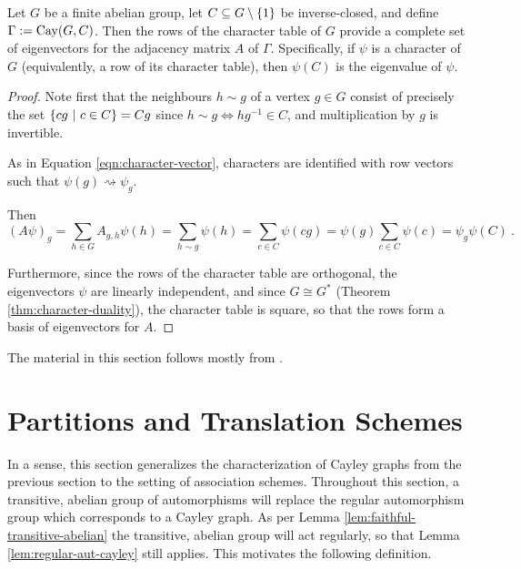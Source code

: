 \documentclass{report}
\begin{document}
    \begin{lem}\label{lem:cayley-eigen}
      Let $G$ be a finite abelian group,
      let $C \subseteq G \setminus \left\lbrace 1 \right\rbrace$ be inverse-closed,
      and define $\Gamma := \operatorname{Cay}(G, C)$.
      Then the rows of the character table of $G$ provide a complete set of
      eigenvectors for the adjacency matrix $A$ of $\Gamma$.
      Specifically, if $\psi$ is a character of $G$ (equivalently, a row of
      its character table), then $\psi(C)$ is the eigenvalue of $\psi$.
    \end{lem}

    \begin{proof}
      Note first that the neighbours $h \sim g$ of a vertex $g \in G$ consist of
      precisely the set $\left\lbrace  cg \ \middle| \ c \in C  \right\rbrace = Cg$ since $h \sim g \iff
      hg^{-1} \in C$, and multiplication by $g$ is invertible.

      As in Equation \ref{eqn:character-vector}, characters are identified with row vectors
      such that $\psi(g) \rightsquigarrow \psi_g$.

      Then
      $$
        (A\psi)_g = \sum_{h \in G} A_{g, h} \psi(h)
        = \sum_{h \sim g} \psi(h) = \sum_{c \in C} \psi(cg)
        = \psi(g) \sum_{c \in C} \psi(c) = \psi_g \psi(C)
        \ .
      $$

      Furthermore, since the rows of the character table are orthogonal,
      the eigenvectors $\psi$ are linearly independent,
      and since $G \cong G^*$ (Theorem \ref{thm:character-duality}), the character table is square,
      so that the rows form a basis of eigenvectors for $A$.
    \end{proof}


    The material in this section follows mostly from \cite[Chapter~9]{godsil}.

  \section{Partitions and Translation Schemes}\label{sec:AS:translation}

    In a sense, this section generalizes the characterization of Cayley graphs
    from the previous section to the setting of association schemes.
    Throughout this section, a transitive, abelian group of automorphisms will
    replace the regular automorphism group which corresponds to a Cayley graph.
    As per Lemma \ref{lem:faithful-transitive-abelian} the transitive, abelian group
    will act regularly, so that Lemma \ref{lem:regular-aut-cayley} still applies.
    This motivates the following definition.
\end{document}

